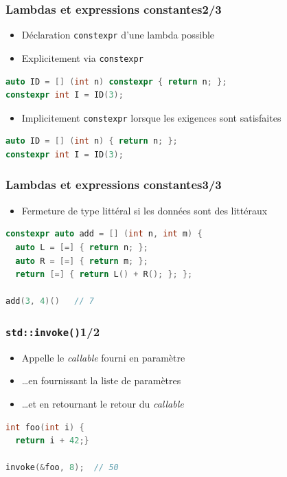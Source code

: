 \documentclass[C++.tex]{subfiles}
\begin{document}
\begin{frame}[fragile]
	\frametitle{Lambdas et expressions constantes\titlehfill{}2/3}
	\begin{itemize}
		\item Déclaration \lstinline|constexpr| d'une lambda possible 
		\item Explicitement via \lstinline|constexpr|
	\end{itemize}

	\begin{lstlisting}[language=C++]
auto ID = [] (int n) constexpr { return n; };
constexpr int I = ID(3);\end{lstlisting}

	\begin{itemize}
		\item Implicitement \lstinline|constexpr| lorsque les exigences sont satisfaites
	\end{itemize}


	\begin{lstlisting}[language=C++]
auto ID = [] (int n) { return n; };
constexpr int I = ID(3);\end{lstlisting}
\end{frame}

\begin{frame}[fragile]
	\frametitle{Lambdas et expressions constantes\titlehfill{}3/3}
	\begin{itemize}
		\item Fermeture de type littéral si les données sont des littéraux
	\end{itemize}

	\begin{lstlisting}[language=C++]
constexpr auto add = [] (int n, int m) {
  auto L = [=] { return n; };
  auto R = [=] { return m; };
  return [=] { return L() + R(); }; };

add(3, 4)()   // 7\end{lstlisting}
\end{frame}

\begin{frame}[fragile]
	\frametitle{\lstinline|std::invoke()|\titlehfill{}1/2}
	\begin{itemize}
		\item Appelle le \textit{callable} fourni en paramètre
		\item \ldots en fournissant la liste de paramètres
		\item \ldots et en retournant le retour du \textit{callable}
	\end{itemize}

	\begin{lstlisting}[language=C++]
int foo(int i) {
  return i + 42;}

invoke(&foo, 8);  // 50\end{lstlisting}
\end{frame}
\end{document}

